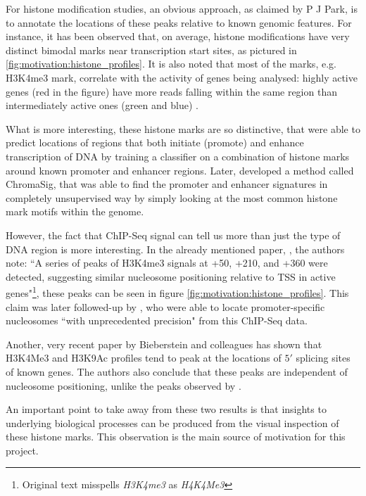 \documentclass[parskip]{cs4rep}
\newcommand{\histonemodification}[1]{#1}
\begin{document}
For histone modification studies, an obvious approach, as claimed by P J Park, is to annotate the locations of these peaks relative to known genomic features. For instance, it has been observed
that, on average, histone modifications have very distinct bimodal marks near transcription start sites, as pictured in \autoref{fig:motivation:histone_profiles}. It is also noted that most of the marks, e.g.
\histonemodification{H3K4me3} mark, correlate with the activity of genes being analysed: highly active genes (red in the figure) have more reads falling within the same region than intermediately active ones (green and blue) \cite{Barski:2007ww}.

What is more interesting, these histone marks are so distinctive, that 
\cite{Heintzman:2007ke} were able to predict locations of regions that both initiate (promote) and enhance transcription of DNA by training a classifier on a combination of histone marks around known promoter and enhancer regions. Later, \cite{Hon:2008wv} developed a method called ChromaSig, that was able to find the promoter and enhancer signatures in completely unsupervised way by simply looking at the most common histone mark motifs within the genome.

However, the fact that ChIP-Seq signal can tell us more than just the type of DNA region is more interesting. In the already mentioned paper, \cite{Barski:2007ww}, the authors note: ``A series of peaks of H3K4me3 signals at +50, +210, and +360 were detected, suggesting similar nucleosome positioning relative to TSS in active genes"\footnote{Original text misspells \emph{H3K4me3} as \emph{H4K4Me3}}, these peaks can be seen in figure \autoref{fig:motivation:histone_profiles}. This claim was later followed-up by \cite{Schmid:2007ue}, who were able to locate promoter-specific nucleosomes ``with unprecedented precision" from this ChIP-Seq data.

Another, very recent paper by Bieberstein and colleagues \cite{Bieberstein:2012tf} has shown that \histonemodification{H3K4Me3} and \histonemodification{H3K9Ac} profiles tend to peak at the locations of $5'$ splicing sites of known genes. The authors also conclude that these peaks are independent of nucleosome positioning, unlike the peaks observed by \cite{Barski:2007ww}.

An important point to take away from these two results is that insights to underlying biological processes can be produced from the visual inspection of these histone marks. This observation is the main source of motivation for this project. 
\end{document}
